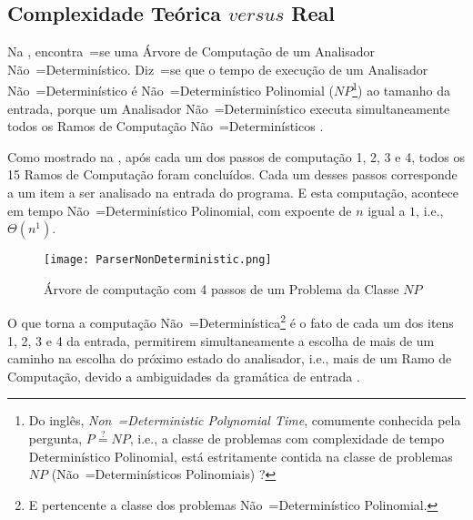 {    \subsection{Complexidade Teórica $versus$ Real}

    Na ,
    encontra~=se uma Árvore de Computação de um Analisador Não~=Determinístico.
    Diz~=se que o tempo de execução de um Analisador Não~=Determinístico é Não~=Determinístico Polinomial ($NP$\footnote{
    Do inglês, \textit{Non~=Deterministic Polynomial Time},
    comumente conhecida pela pergunta,
    $P \stackrel{?}{=} NP$, i.e.,
    a classe de problemas com complexidade de tempo Determinístico Polinomial,
    está estritamente contida na classe de problemas $NP$ (Não~=Determinísticos Polinomiais) \cite{computationalComplexityAuroraBarak}?
    }) ao tamanho da entrada,
    porque um Analisador Não~=Determinístico executa simultaneamente todos os Ramos de Computação Não~=Determinísticos \cite{hopcroftBook,turingMachinesRoyer}.

    Como mostrado na ,
    após cada um dos passos de computação 1,
    2, 3 e 4,
    todos os 15 Ramos de Computação foram concluídos.
    Cada um desses passos corresponde a um item a ser analisado na entrada do programa.
    E esta computação,
    acontece em tempo Não~=Determinístico Polinomial,
    com expoente de $n$ igual a $1$,
    i.e.,
    $\Theta(n^1)$.
    \begin{figure}[!htb]
    \caption{Árvore de computação com 4 passos  de um Problema da Classe $NP$}
    \label{figure:ParserNonDeterministic}
    \centering
    \texttt{[image: ParserNonDeterministic.png]}
    \end{figure}

    O que torna a computação Não~=Determinística\footnote{
    E pertencente a classe dos problemas Não~=Determinístico Polinomial.
    } é o fato de cada um dos itens 1,
    2, 3 e 4 da entrada,
    permitirem simultaneamente a escolha de mais de um caminho na escolha do próximo estado do analisador,
    i.e.,
    mais de um Ramo de Computação,
    devido a ambiguidades da gramática de entrada \cite{detectingAmbiguityInGrammars,antlrBookTerrentParr}.

}
